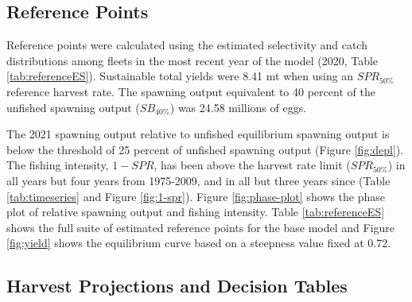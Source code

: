 \documentclass[11pt,
  english,
  a4paper,
]{article}
\begin{document}
\leavevmode\tagmcend\tagstructend


\hypertarget{reference-points}{%
\subsection{Reference Points}\label{reference-points}}

\leavevmode\tagmcend\tagstructend


Reference points were calculated using the estimated selectivity and catch distributions among fleets in the most recent year of the model (2020, Table \ref{tab:referenceES}). Sustainable total yields were 8.41 mt when using an {\(SPR_{50\%}\)\leavevmode\tagmcend\tagstructend} reference harvest rate. The spawning output equivalent to 40 percent of the unfished spawning output ({\(SB_{40\%}\)\leavevmode\tagmcend\tagstructend}) was 24.58 millions of eggs.

\leavevmode\tagmcend\tagstructend\par


The 2021 spawning output relative to unfished equilibrium spawning output is below the threshold of 25 percent of unfished spawning output (Figure \ref{fig:depl}). The fishing intensity, {\(1-SPR\)\leavevmode\tagmcend\tagstructend}, has been above the harvest rate limit ({\(SPR_{50\%}\)\leavevmode\tagmcend\tagstructend}) in all years but four years from 1975-2009, and in all but three years since (Table \ref{tab:timeseries} and Figure \ref{fig:1-spr}). Figure \ref{fig:phase-plot} shows the phase plot of relative spawning output and fishing intensity. Table \ref{tab:referenceES} shows the full suite of estimated reference points for the base model and Figure \ref{fig:yield} shows the equilibrium curve based on a steepness value fixed at 0.72.

\leavevmode\tagmcend\tagstructend\par


\hypertarget{harvest-projections-and-decision-tables}{%
\subsection{Harvest Projections and Decision Tables}\label{harvest-projections-and-decision-tables}}
\end{document}
